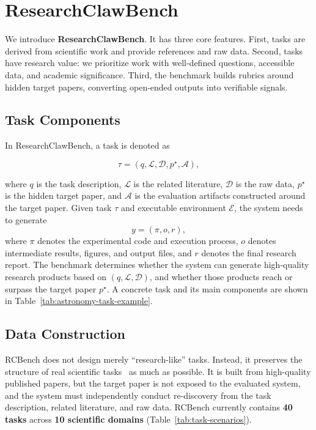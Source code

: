 \section{ResearchClawBench}
\label{sec:researchclawbench}

We introduce \textbf{ResearchClawBench}. It has three core features. First, tasks are derived from scientific work and provide references and raw data. Second, tasks have research value: we prioritize work with well-defined questions, accessible data, and academic significance. Third, the benchmark builds rubrics around hidden target papers, converting open-ended outputs into verifiable signals.

\subsection{Task Components}

In ResearchClawBench, a task is denoted as

\vspace{-1em}
\[
\tau = (q, \mathcal{L}, \mathcal{D}, p^\star, \mathcal{A}),
\]
\vspace{-1.5em}

where \(q\) is the task description, \(\mathcal{L}\) is the related literature, \(\mathcal{D}\) is the raw data, \(p^\star\) is the hidden target paper, and \(\mathcal{A}\) is the evaluation artifacts constructed around the target paper. Given task \(\tau\) and executable environment \(\mathcal{E}\), the system needs to generate
\[
y = (\pi, o, r),
\]
where \(\pi\) denotes the experimental code and execution process, \(o\) denotes intermediate results, figures, and output files, and \(r\) denotes the final research report. The benchmark determines whether the system can generate high-quality research products based on \((q, \mathcal{L}, \mathcal{D})\), and whether those products reach or surpass the target paper \(p^\star\). A concrete task and its main components are shown in Table~\ref{tab:astronomy-task-example}.


\subsection{Data Construction}

RCBench does not design merely ``research-like'' tasks. Instead, it preserves the structure of real scientific tasks~\citep{zhou2023webarena} as much as possible. It is built from high-quality published papers, but the target paper is not exposed to the evaluated system, and the system must independently conduct re-discovery from the task description, related literature, and raw data. RCBench currently contains \textbf{40 tasks} across \textbf{10 scientific domains} (Table~\ref{tab:task-scenarios}).

